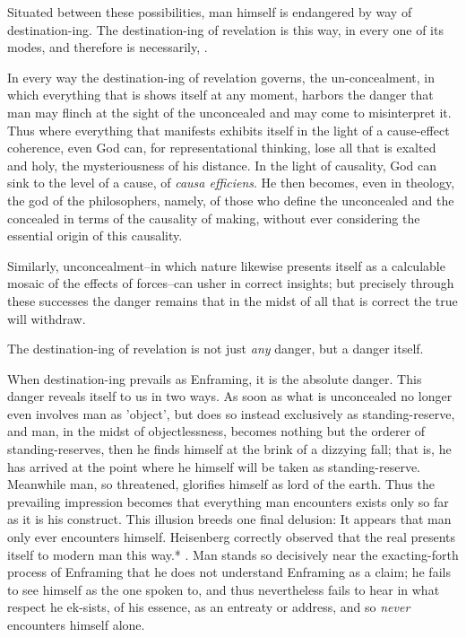 Situated between these possibilities, man himself is endangered by way of destination-ing. The destination-ing of revelation is this way, in every one of its modes, and therefore is necessarily, .

In every way the destination-ing of revelation governs, the un-concealment, in which everything that is shows itself at any moment, harbors the danger that man may flinch at the sight of the unconcealed and may come to misinterpret it. Thus where everything that manifests exhibits itself in the light of a cause-effect coherence, even God can, for representational thinking, lose all that is exalted and holy, the mysteriousness of his distance. In the light of causality, God can sink to the level of a cause, of \textit{causa efficiens}. He then becomes, even in theology, the god of the philosophers, namely, of those who define the unconcealed and the concealed in terms of the causality of making, without ever considering the essential origin of this causality.

Similarly, unconcealment--in which nature likewise presents itself as a calculable mosaic of the effects of forces--can usher in correct insights; but precisely through these successes the danger remains that in the midst of all that is correct the true will withdraw.

The destination-ing of revelation is not just \textit{any} danger, but a danger itself.

When destination-ing prevails as Enframing, it is the absolute danger. This danger reveals itself to us in two ways. As soon as what is unconcealed no longer even involves man as 'object', but does so instead exclusively as standing-reserve, and man, in the midst of objectlessness, becomes nothing but the orderer of standing-reserves, then he finds himself at the brink of a dizzying fall; that is, he has arrived at the point where he himself will be taken as standing-reserve. Meanwhile man, so threatened, glorifies himself as lord of the earth. Thus the prevailing impression becomes that everything man encounters exists only so far as it is his construct. This illusion breeds one final delusion: It appears that man only ever encounters himself. Heisenberg correctly observed that the real presents itself to modern man this way.* . Man stands so decisively near the exacting-forth process of Enframing that he does not understand Enframing as a claim; he fails to see himself as the one spoken to, and thus nevertheless fails to hear in what respect he ek-sists, of his essence, as an entreaty or address, and so \textit{never} encounters himself alone.

